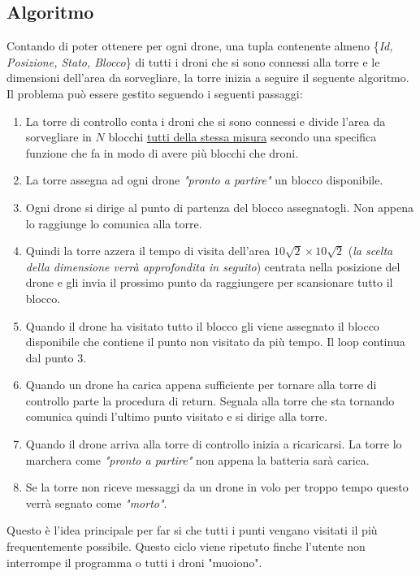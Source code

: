 \documentclass[a4paper, 11pt]{article}
\begin{document}
\subsection{Algoritmo}
Contando di poter ottenere per ogni drone, una tupla contenente almeno \{\textit{Id, Posizione, Stato, Blocco}\} di tutti i droni che si sono connessi alla torre e le dimensioni dell'area da sorvegliare, la torre inizia a seguire il seguente algoritmo.
Il problema può essere gestito seguendo i seguenti passaggi:
\begin{enumerate}
    
    \item La torre di controllo conta i droni che si sono connessi e divide l'area da sorvegliare in $N$ blocchi \underline{tutti della stessa misura}
     secondo una specifica funzione che fa in modo di avere più blocchi che droni.

    \item La torre assegna ad ogni drone \textit{"pronto a partire"} un blocco disponibile.

    \item Ogni drone si dirige al punto di partenza del blocco assegnatogli. Non appena lo raggiunge lo comunica alla torre.

    \item Quindi la torre azzera il tempo di visita dell'area $10\sqrt 2\times 10\sqrt 2$ (\textit{la scelta della dimensione verrà approfondita in seguito}) centrata nella posizione del drone e gli invia il prossimo punto da raggiungere
     per scansionare tutto il blocco.

    \item Quando il drone ha visitato tutto il blocco gli viene assegnato il blocco disponibile che contiene il punto non visitato da più tempo. Il loop continua dal punto 3.
    \item Quando un drone ha carica appena sufficiente per tornare alla torre di controllo parte la procedura di return. 
    Segnala alla torre che sta tornando comunica quindi l'ultimo punto visitato e si dirige alla torre.
    
    \item Quando il drone arriva alla torre di controllo inizia a ricaricarsi.
    La torre lo marchera come \textit{"pronto a partire"} non appena la batteria sarà carica.

    \item Se la torre non riceve messaggi da un drone in volo per troppo tempo questo verrà segnato come \textit{"morto"}. 
\end{enumerate}
Questo è l'idea principale per far si che tutti i punti vengano visitati il più frequentemente possibile.
Questo ciclo viene ripetuto finche l'utente non interrompe il programma o tutti i droni "muoiono".
\end{document}
